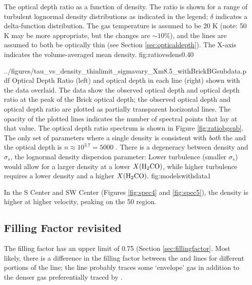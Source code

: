 {The optical depth ratio as a function of \hh density.  The ratio is shown for
a range of turbulent lognormal density distributions as indicated in the legend;
$\delta$ indicates a delta-function distribution.
The gas temperature is assumed to be 20 K (note: 50 K may be more appropriate, but the changes
are $\sim10\%$), and the \formaldehyde lines
are assumed to both be optically thin (see Section \ref{sec:opticaldepth}).
The X-axis indicates the volume-averaged mean \hh density. }
{fig:ratiovsdens}{0.4}{0}

          {../figures/tau_vs_density_thinlimit_sigmavary_Xm8.5_withBrickBGsubdata.pdf}
{Optical Depth Ratio (left) and optical depth in each line (right) shown with the
data overlaid.  The data show the observed optical depth and optical depth ratio
at the peak of the Brick \oneone optical depth; the observed optical depth and
optical depth ratio are plotted as partially transparent horizontal lines.  The
opacity of the plotted lines indicates the number of spectral points that lay
at that value.  The optical depth ratio spectrum is shown in Figure
\ref{fig:ratiobgsub}.  The only set of parameters where a single density is
consistent with \emph{both} the \oneone and the \twotwo optical depth is
$n\approx10^{3.7} = 5000$ \percc.  There is a degeneracy between density and
$\sigma_s$, the lognormal density dispersion parameter: Lower turbulence
(smaller $\sigma_s$) would allow for a larger density at a lower
$X(\textrm{H}_2\textrm{CO})$, while higher turbulence requires a lower density and a
higher $X(\textrm{H}_2\textrm{CO})$.
}
{fig:modelswithdata}{1}


In the S Center and SW Center (Figures \ref{fig:spec4} and \ref{fig:spec5}),
the density is higher at higher velocity, peaking on the 50 \kms region.

\subsection{Filling Factor revisited}
The filling factor has an upper limit of 0.75 (Section \ref{sec:fillingfactor}.
Most likely, there is a difference in the filling factor between the \oneone
and \twotwo lines for different portions of the line; the \oneone line probably
traces some `envelope' gas in addition to the denser gas preferentially traced
by \twotwo.  

